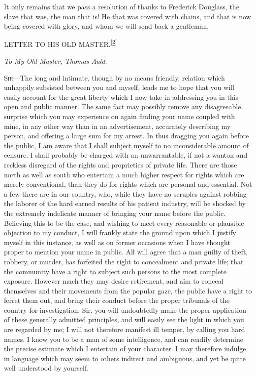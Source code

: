 It only remains that we pass a resolution of thanks to Frederick
Douglass, the slave that was, the man that is! He that was covered with
chains, and that is now being covered with glory, and whom we will send
back a gentleman.

{\protect\hypertarget{ux5cux7bux5cux7bux5cux7b1ux5cux7dux5cux7dux5cux7d}{}{}}

{\protect\hypertarget{421}{}{}}

{LETTER TO HIS OLD
MASTER.\textsuperscript{\protect\hyperlink{cite_note-2}{{[}2{]}}}}

\emph{To My Old Master, Thomas Auld.}

\textsc{Sir}---The long and intimate, though by no means friendly,
relation which unhappily subsisted between you and myself, leads me to
hope that you will easily account for the great liberty which I now take
in addressing you in this open and public manner. The same fact may
possibly remove any disagreeable surprise which you may experience on
again finding your name coupled with mine, in any other way than in an
advertisement, accurately describing my person, and offering a large sum
for my arrest. In thus dragging you again before the public, I am aware
that I shall subject myself to no inconsiderable amount of censure. I
shall probably be charged with an unwarrantable, if not a wanton and
reckless disregard of the rights and proprieties of private life. There
are those north as well as south who entertain a much higher respect for
rights which are merely conventional, than they do for rights which are
personal and essential. Not a few there are in our country, who, while
they have no scruples against robbing the laborer of the hard earned
results of his patient industry, will be shocked by the extremely
indelicate manner of bringing your name before the public. Believing
this to be the case, and wishing to meet every reasonable or plausible
objection to my conduct, I will frankly state the ground upon which I
justify myself in this instance, as well as on former occasions when I
have thought proper to mention your name in public. All will agree that
a man guilty of theft, robbery, or murder, has forfeited the right to
concealment and private life; that the community have a right to subject
such persons to the most complete exposure. However much they may desire
{\protect\hypertarget{422}{}{}}retirement, and aim to conceal themselves
and their movements from the popular gaze, the public have a right to
ferret them out, and bring their conduct before the proper tribunals of
the country for investigation. Sir, you will undoubtedly make the proper
application of these generally admitted principles, and will easily see
the light in which you are regarded by me; I will not therefore manifest
ill temper, by calling you hard names. I know you to be a man of some
intelligence, and can readily determine the precise estimate which I
entertain of your character. I may therefore indulge in language which
may seem to others indirect and ambiguous, and yet be quite well
understood by yourself.

